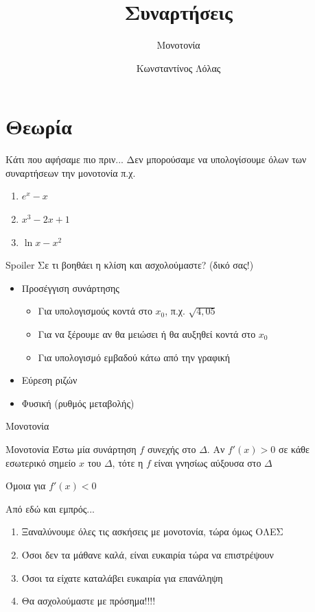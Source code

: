 \documentclass{presentation}
\title{Συναρτήσεις}
\subtitle{Μονοτονία}
\author[Λόλας]{Κωνσταντίνος Λόλας}
\begin{document}
\begin{frame}
  \titlepage
\end{frame}

\section{Θεωρία}
\begin{frame}{Κάτι που αφήσαμε πιο πριν...}
  Δεν μπορούσαμε να υπολογίσουμε όλων των συναρτήσεων την μονοτονία π.χ.
  \begin{enumerate}
    \item $e^x-x$
    \item $x^3-2x+1$
    \item $\ln x - x^2$
  \end{enumerate}
\end{frame}

\begin{frame}{Spoiler}
  Σε τι βοηθάει η κλίση και ασχολούμαστε? (δικό σας!)
  \begin{itemize}
    \item<2-> Προσέγγιση συνάρτησης
          \begin{itemize}
            \item<3-> Για υπολογισμούς κοντά στο $x_0$, π.χ. $\sqrt{4,05}$
            \item<4-> Για να ξέρουμε αν θα μειώσει ή θα αυξηθεί κοντά στο $x_0$
            \item<5-> Για υπολογισμό εμβαδού κάτω από την γραφική
          \end{itemize}
    \item<6-> Εύρεση ριζών
    \item<7-> Φυσική (ρυθμός μεταβολής)
  \end{itemize}
\end{frame}

\begin{frame}[label=Θεώρημα1]{Μονοτονία}
  \begin{block}{Μονοτονία}
    Έστω μία συνάρτηση $f$ συνεχής στο $Δ$. Αν $f'(x)>0$ σε κάθε εσωτερικό σημείο $x$ του $Δ$, τότε η $f$ είναι γνησίως αύξουσα στο $Δ$
  \end{block}
   Όμοια για $f'(x)<0$

  \hyperlink{Απόδειξη1}{}
\end{frame}

\begin{frame}{Από εδώ και εμπρός...}
  \begin{enumerate}
    \item<1-> Ξαναλύνουμε όλες τις ασκήσεις με μονοτονία, τώρα όμως ΟΛΕΣ
    \item<2-> Όσοι δεν τα μάθανε καλά, είναι ευκαιρία τώρα να επιστρέψουν
    \item<3-> Όσοι τα είχατε καταλάβει ευκαιρία για επανάληψη
    \item<4-> Θα ασχολούμαστε με πρόσημα!!!!
  \end{enumerate}
\end{frame}
\end{document}

